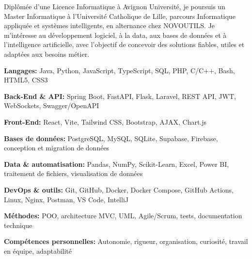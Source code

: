 \documentclass[10pt]{article}
\begin{document}
\color{darktext}\fontsize{9.3}{11.1}\selectfont


{\fontsize{9.6}{11.6}\selectfont
Diplômée d'une Licence Informatique à Avignon Université, je poursuis un Master Informatique à l'Université Catholique de Lille, parcours Informatique appliquée et systèmes intelligents, en alternance chez NOVOUTILS\@. Je m'intéresse au développement logiciel, à la data, aux bases de données et à l'intelligence artificielle, avec l'objectif de concevoir des solutions fiables, utiles et adaptées aux besoins métier.\par}

\textbf{Langages:} Java, Python, JavaScript, TypeScript, SQL, PHP, C/C++, Bash, HTML5, CSS3\par
\textbf{Back-End \& API:} Spring Boot, FastAPI, Flask, Laravel, REST API, JWT, WebSockets, Swagger/OpenAPI\par
\textbf{Front-End:} React, Vite, Tailwind CSS, Bootstrap, AJAX, Chart.js\par
\textbf{Bases de données:} PostgreSQL, MySQL, SQLite, Supabase, Firebase, conception et migration de données\par
\textbf{Data \& automatisation:} Pandas, NumPy, Scikit-Learn, Excel, Power BI, traitement de fichiers, visualisation de données\par
\textbf{DevOps \& outils:} Git, GitHub, Docker, Docker Compose, GitHub Actions, Linux, Nginx, Postman, VS Code, IntelliJ\par
\textbf{Méthodes:} POO, architecture MVC, UML, Agile/Scrum, tests, documentation technique\par
\textbf{Compétences personnelles:} Autonomie, rigueur, organisation, curiosité, travail en équipe, adaptabilité\par
\end{document}
